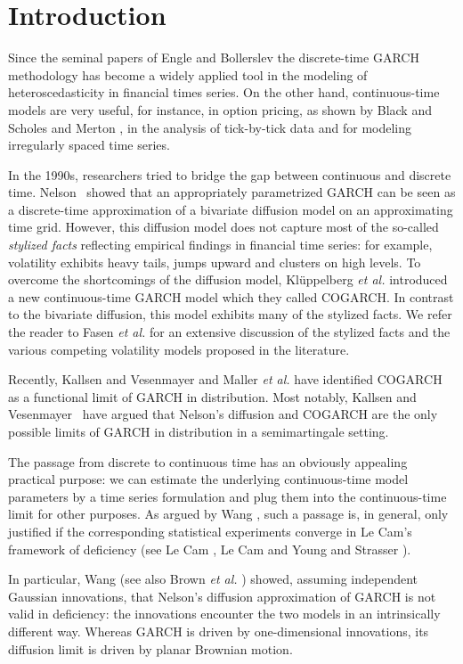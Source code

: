 \documentclass[number,citesort,seceqn,dvips]{arxbj}
\begin{document}
\section{Introduction}\label{s1}
Since the seminal papers of Engle \cite{Engle82} and Bollerslev
\cite{Bo86} the discrete-time GARCH methodology has become a
widely applied tool in the modeling of heteroscedasticity in
financial times series. On the other hand, continuous-time models are
very useful, for instance, in option pricing, as shown by Black and
Scholes \cite{BS73} and Merton \cite{Me73}, in the
analysis of tick-by-tick data and for modeling irregularly spaced time
series.

In the 1990s, researchers tried to bridge the gap between continuous
and discrete time. Nelson~\cite{Ne90} showed that an
appropriately parametrized GARCH can be seen as a discrete-time
approximation of a bivariate diffusion model on an approximating time
grid. However, this diffusion model does not capture most of the
so-called \textit{stylized facts} reflecting empirical findings in
financial time series: for example, volatility exhibits heavy tails,
jumps upward and clusters on high levels. To overcome the shortcomings
of the diffusion model, Kl\"{u}ppelberg \textit{et al.} \cite{KLM04}
introduced a new continuous-time GARCH model which they called COGARCH.
In contrast to the bivariate diffusion, this model exhibits many of the
stylized facts. We refer the reader to Fasen \textit{et al.}
\cite{FKL06} for an extensive discussion of the stylized facts and the
various competing volatility models proposed in the literature.

Recently, Kallsen and Vesenmayer \cite{KV07} and Maller \textit{et
al.} \cite{MMS08} have identified COGARCH as a functional limit
of GARCH in distribution. Most notably, Kallsen and
Vesenmayer~\cite{KV07} have argued that Nelson's diffusion and COGARCH
are the only possible limits of GARCH in distribution in a
semimartingale setting.

The passage from discrete to continuous time has an obviously appealing
practical purpose: we can estimate the underlying continuous-time model
parameters by a time series formulation and plug them into the
continuous-time limit for other purposes. As argued by Wang
\cite{Wa02}, such a passage is, in general, only justified if the
corresponding statistical experiments converge in Le Cam's framework of
deficiency (see Le Cam \cite{LC86}, Le Cam and Young
\cite{LY90} and Strasser \cite{St85}).

In particular, Wang \cite{Wa02} (see also Brown \textit{et al.}
\cite{BWZ03}) showed, assuming independent Gaussian innovations, that
Nelson's diffusion approximation of GARCH is not valid in deficiency:
the innovations encounter the two models in an intrinsically different
way. Whereas GARCH is driven by one-dimensional innovations, its
diffusion limit is driven by planar Brownian motion.
\end{document}
